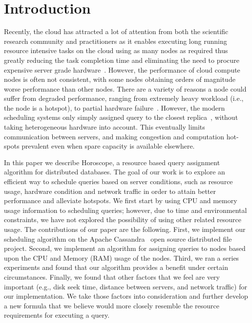 \section{Introduction}

Recently, the cloud has attracted a lot of attention from both the scientific research community and practitioners as it enables executing long running resource intensive tasks on the cloud using as many nodes as required thus greatly reducing the task completion time and eliminating the need to procure expensive server grade hardware~\cite{Agrawal:2008:CRD:1462571.1462573}. However, the performance of cloud compute nodes is often not consistent, with some nodes obtaining orders of magnitude worse performance than other nodes. There are a variety of reasons a node could suffer from degraded performance, ranging from extremely heavy workload (i.e., the node is a hotspot), to partial hardware failure~\cite{citeulike:6656195}. However, the modern scheduling systems only simply assigned query to the closest replica~\cite{borthakur-07}, without taking heterogeneous hardware into account. This eventually limits communication between servers, and making congestion and computation hot-spots prevalent even when spare capacity is available elsewhere.

In this paper we describe Horoscope, a resource based query assignment algorithm for distributed databases. The goal of our work is to explore an efficient way to schedule queries based on server conditions, such as resource usage, hardware condition and network traffic in order to attain better performance and alleviate hotspots. We first start by using CPU and memory usage information to scheduling queries; however, due to time and environmental constraints, we have not explored the possibility of using other related resource usage. The contributions of our paper are the following. First, we implement our scheduling algorithm on the Apache Cassandra~\cite{ Lakshman:2010:CDS:1773912.1773922} open source distributed file project. Second, we implement an algorithm for assigning queries to nodes based upon the CPU and Memory (RAM) usage of the nodes. Third, we ran a series experiments and found that our algorithm provides a benefit under certain circumstances. Finally, we found that other factors that we feel are very important (e.g., disk seek time, distance between servers, and network traffic) for our implementation. We take those factors into consideration and further develop a new formula that we believe would more closely resemble the resource requirements for executing a query.
 
